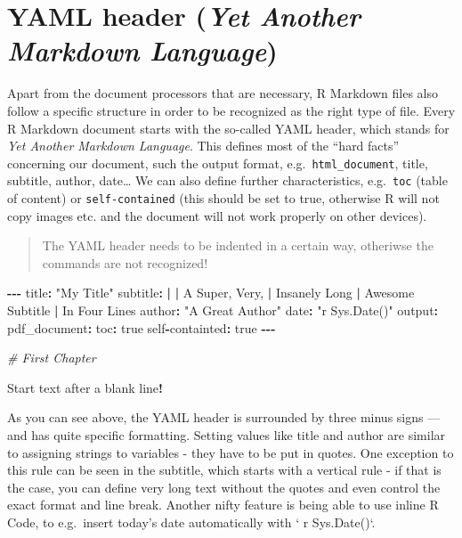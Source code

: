 \documentclass[
]{book}
\newenvironment{Shaded}{\begin{snugshade}}{\end{snugshade}}
\newcommand{\CommentTok}[1]{\textcolor[rgb]{0.56,0.35,0.01}{\textit{#1}}}
\newcommand{\ErrorTok}[1]{\textcolor[rgb]{0.64,0.00,0.00}{\textbf{#1}}}
\newcommand{\NormalTok}[1]{#1}
\newcommand{\SpecialCharTok}[1]{\textcolor[rgb]{0.81,0.36,0.00}{\textbf{#1}}}
\newcommand{\StringTok}[1]{\textcolor[rgb]{0.31,0.60,0.02}{#1}}
\begin{document}
\section{\texorpdfstring{YAML header (\emph{Yet Another Markdown Language})}{YAML header (Yet Another Markdown Language)}}\label{yaml-header-yet-another-markdown-language}

Apart from the document processors that are necessary, R Markdown files also follow a specific structure in order to be recognized as the right type of file.
Every R Markdown document starts with the so-called YAML header, which stands for \emph{Yet Another Markdown Language}.
This defines most of the ``hard facts'' concerning our document, such the output format, e.g.~\texttt{html\_document}, title, subtitle, author, date\ldots{}
We can also define further characteristics, e.g.~\texttt{toc} (table of content) or \texttt{self-contained} (this should be set to true, otherwise R will not copy images etc. and the document will not work properly on other devices).

\begin{quote}
The YAML header needs to be indented in a certain way, otheriwse the commands are not recognized!
\end{quote}

\begin{Shaded}
\begin{Highlighting}[]
\SpecialCharTok{{-}{-}{-}}
\NormalTok{title}\SpecialCharTok{:} \StringTok{"My Title"}
\NormalTok{subtitle}\SpecialCharTok{:} \ErrorTok{|}
    \ErrorTok{|}\NormalTok{ A Super, Very,}
    \SpecialCharTok{|}\NormalTok{ Insanely Long}
    \SpecialCharTok{|}\NormalTok{ Awesome Subtitle}
    \SpecialCharTok{|}\NormalTok{ In Four Lines}
\NormalTok{author}\SpecialCharTok{:} \StringTok{"A Great Author"}
\NormalTok{date}\SpecialCharTok{:} \StringTok{"\textasciigrave{}r Sys.Date()\textasciigrave{}"}
\NormalTok{output}\SpecialCharTok{:} 
\NormalTok{  pdf\_document}\SpecialCharTok{:}
\NormalTok{    toc}\SpecialCharTok{:}\NormalTok{ true}
\NormalTok{    self}\SpecialCharTok{{-}}\NormalTok{containted}\SpecialCharTok{:}\NormalTok{ true}
\SpecialCharTok{{-}{-}{-}}

\CommentTok{\# First Chapter}

\NormalTok{Start text after a blank line}\SpecialCharTok{!} 
\end{Highlighting}
\end{Shaded}

As you can see above, the YAML header is surrounded by three minus signs --- and has quite specific formatting.
Setting values like title and author are similar to assigning strings to variables - they have to be put in quotes.
One exception to this rule can be seen in the subtitle, which starts with a vertical rule \textbar{} - if that is the case, you can define very long text without the quotes and even control the exact format and line break.
Another nifty feature is being able to use inline R Code, to e.g.~insert today's date automatically with ` r Sys.Date()`.
\end{document}
